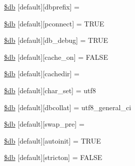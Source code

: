 \begin{DoxyCompactItemize}
\item 
\hyperlink{database_8php_ae0a3c1b4e2a1907dc70671ee97901456}{\$db} \mbox{[}\textquotesingle{}default\textquotesingle{}\mbox{]}\mbox{[}\textquotesingle{}dbprefix\textquotesingle{}\mbox{]} = \textquotesingle{}\textquotesingle{}
\item 
\hyperlink{database_8php_a0bf35d484095b6728c2666580924569b}{\$db} \mbox{[}\textquotesingle{}default\textquotesingle{}\mbox{]}\mbox{[}\textquotesingle{}pconnect\textquotesingle{}\mbox{]} = T\+R\+UE
\item 
\hyperlink{database_8php_aa79c6a73d78063a2b2ee6903a9851908}{\$db} \mbox{[}\textquotesingle{}default\textquotesingle{}\mbox{]}\mbox{[}\textquotesingle{}db\+\_\+debug\textquotesingle{}\mbox{]} = T\+R\+UE
\item 
\hyperlink{database_8php_a05a82adb11460f351c1df4ae9be71866}{\$db} \mbox{[}\textquotesingle{}default\textquotesingle{}\mbox{]}\mbox{[}\textquotesingle{}cache\+\_\+on\textquotesingle{}\mbox{]} = F\+A\+L\+SE
\item 
\hyperlink{database_8php_a12683252490249e3294aebaca97c4126}{\$db} \mbox{[}\textquotesingle{}default\textquotesingle{}\mbox{]}\mbox{[}\textquotesingle{}cachedir\textquotesingle{}\mbox{]} = \textquotesingle{}\textquotesingle{}
\item 
\hyperlink{database_8php_a581bc2f1f3fa806239c44e2c2293dc59}{\$db} \mbox{[}\textquotesingle{}default\textquotesingle{}\mbox{]}\mbox{[}\textquotesingle{}char\+\_\+set\textquotesingle{}\mbox{]} = \textquotesingle{}utf8\textquotesingle{}
\item 
\hyperlink{database_8php_ab03697bf8340acfa74bf20c952aa81c7}{\$db} \mbox{[}\textquotesingle{}default\textquotesingle{}\mbox{]}\mbox{[}\textquotesingle{}dbcollat\textquotesingle{}\mbox{]} = \textquotesingle{}utf8\+\_\+general\+\_\+ci\textquotesingle{}
\item 
\hyperlink{database_8php_af35b6847ece1c0a956c97ebb90186e45}{\$db} \mbox{[}\textquotesingle{}default\textquotesingle{}\mbox{]}\mbox{[}\textquotesingle{}swap\+\_\+pre\textquotesingle{}\mbox{]} = \textquotesingle{}\textquotesingle{}
\item 
\hyperlink{database_8php_a217a1c42eadc83da9cdd9e3d694e53fa}{\$db} \mbox{[}\textquotesingle{}default\textquotesingle{}\mbox{]}\mbox{[}\textquotesingle{}autoinit\textquotesingle{}\mbox{]} = T\+R\+UE
\item 
\hyperlink{database_8php_a5722ababeee63dd26d82734e3fa83b7c}{\$db} \mbox{[}\textquotesingle{}default\textquotesingle{}\mbox{]}\mbox{[}\textquotesingle{}stricton\textquotesingle{}\mbox{]} = F\+A\+L\+SE
\end{DoxyCompactItemize}


